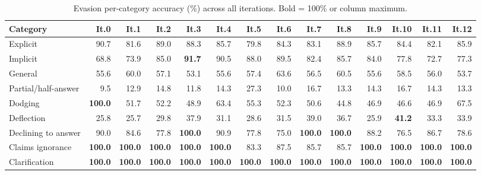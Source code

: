 \documentclass[11pt]{article}
\begin{document}
\begin{table}[tp]
\centering
\scriptsize
\setlength{\tabcolsep}{5pt}
\begin{tabular}{@{}lrrrrrrrrrrrrr@{}}
\toprule
\textbf{Category} & \textbf{It.0} & \textbf{It.1} & \textbf{It.2} & \textbf{It.3} & \textbf{It.4} & \textbf{It.5} & \textbf{It.6} & \textbf{It.7} & \textbf{It.8} & \textbf{It.9} & \textbf{It.10} & \textbf{It.11} & \textbf{It.12} \\
\midrule
Explicit            & 90.7 & 81.6 & 89.0 & 88.3 & 85.7 & 79.8 & 84.3 & 83.1 & 88.9 & 85.7 & 84.4 & 82.1 & 85.9 \\
Implicit            & 68.8 & 73.9 & 85.0 & \textbf{91.7} & 90.5 & 88.0 & 89.5 & 82.4 & 85.7 & 84.0 & 77.8 & 72.7 & 77.3 \\
General             & 55.6 & 60.0 & 57.1 & 53.1 & 55.6 & 57.4 & 63.6 & 56.5 & 60.5 & 55.6 & 58.5 & 56.0 & 53.7 \\
Partial/half-answer &  9.5 & 12.9 & 14.8 & 11.8 & 14.3 & 27.3 & 10.0 & 16.7 & 13.3 & 14.3 & 16.7 & 14.3 & 13.3 \\
Dodging             & \textbf{100.0} & 51.7 & 52.2 & 48.9 & 63.4 & 55.3 & 52.3 & 50.6 & 44.8 & 46.9 & 46.6 & 46.9 & 67.5 \\
Deflection          & 25.8 & 25.7 & 29.8 & 37.9 & 31.1 & 28.6 & 31.5 & 39.0 & 36.7 & 25.9 & \textbf{41.2} & 33.3 & 33.9 \\
Declining to answer & 90.0 & 84.6 & 77.8 & \textbf{100.0} & 90.9 & 77.8 & 75.0 & \textbf{100.0} & \textbf{100.0} & 88.2 & 76.5 & 86.7 & 78.6 \\
Claims ignorance    & \textbf{100.0} & \textbf{100.0} & \textbf{100.0} & \textbf{100.0} & \textbf{100.0} & 83.3 & 87.5 & 85.7 & 85.7 & \textbf{100.0} & \textbf{100.0} & \textbf{100.0} & \textbf{100.0} \\
Clarification       & \textbf{100.0} & \textbf{100.0} & \textbf{100.0} & \textbf{100.0} & \textbf{100.0} & \textbf{100.0} & \textbf{100.0} & \textbf{100.0} & \textbf{100.0} & \textbf{100.0} & \textbf{100.0} & \textbf{100.0} & \textbf{100.0} \\
\bottomrule
\end{tabular}
\caption{Evasion per-category accuracy (\%) across all iterations. Bold = 100\% or column maximum.}
\label{tab:evasion-per-cat}
\end{table}
\end{document}
